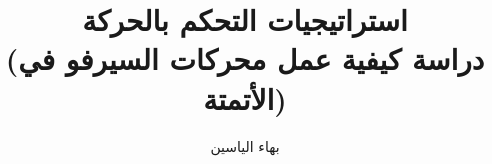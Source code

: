 \documentclass[12pt,a4paper,fleqn]{report}
\begin{document}

\title{ استراتيجيات التحكم بالحركة \\ (دراسة كيفية عمل محركات السيرفو في الأتمتة)}
\author{بهاء الياسين}


\maketitle



\tableofcontents
\clearpage










\end{document}
